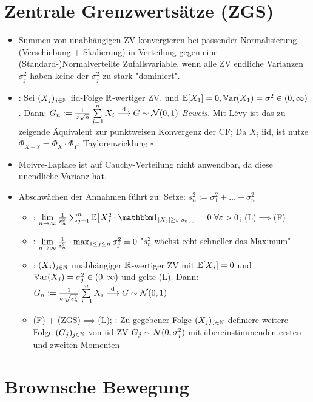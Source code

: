 \documentclass[12pt]{scrartcl}
\begin{document}
	\section{Zentrale Grenzwertsätze (ZGS)}
	
	\begin{itemize}
		\item Summen von unabhängigen ZV konvergieren bei passender Normalisierung (Verschiebung + Skalierung) in Verteilung gegen eine (Standard-)Normalverteilte Zufallsvariable, wenn alle ZV endliche Varianzen $\sigma_j^2$ haben  keine der $\sigma_j^2$ zu stark "dominiert".
		\item {}: Sei $(X_j)_{j\in\mathbb{N}}$ iid-Folge $\mathbb{R}$-wertiger ZV. und $\mathbb{E}[X_1]=0,\mathbb{V}\text{ar}(X_1)=\sigma^2\in(0,\infty)$. Dann: $G_n:=\frac{1}{\sigma\sqrt{n}}\sum\limits_{j=1}^n X_i\overset{\mathrm{d}}{\longrightarrow} G\sim\mathcal{N}(0,1)$
		\textit{Beweis.} Mit Lévy ist das zu zeigende Äquivalent zur punktweisen Konvergenz der CF; Da $X_i$ iid, ist nutze $\Phi_{X+Y}=\Phi_X\cdot\Phi_Y$; Taylorenwicklung $\square$
		\item Moivre-Laplace ist auf Cauchy-Verteilung nicht anwendbar, da diese unendliche Varianz hat.
		\item Abschwächen der Annahmen führt zu:  Setze: $s_n^2:=\sigma_1^2+\ldots+\sigma_n^2$
		\begin{itemize}
			\item {}: $\limn\frac{1}{s_n^2}\sum_{j=1}^n\E\big[X_j^2\cdot\indi_{|X_j|\geq\varepsilon\cdot s_n\rbrace}\big]=0~\forall\varepsilon>0$; (L)$\implies$(F)
			\item {}: $\lim\limits_{n\to\infty}\frac{1}{s_n^2}\cdot\max_{1\leq j\leq n}\sigma_j^2=0$
			"$s_n^2$ wächst echt schneller das Maximum"
			\item {}: $(X_j)_{j\in\mathbb{N}}$ unabhängiger $\mathbb{R}$-wertiger ZV mit $\mathbb{E}[X_j]=0$ und $\mathbb{V}\text{ar}(X_j)=\sigma_j^2\in(0,\infty)$ und gelte (L).
			Dann: $G_n:=\frac{1}{\sigma\sqrt{s_n^2}}\sum\limits_{j=1}^n X_i\overset{\mathrm{d}}{\longrightarrow} G\sim\mathcal{N}(0,1)$
			\item (F) + (ZGS)$\implies$(L); : Zu gegebener Folge $(X_j)_{j\in\mathbb{N}}$ definiere weitere Folge $(G_j)_{j\in\mathbb{N}}$ von iid ZV $G_j\sim\mathcal{N}(0,\sigma_j^2)$ mit übereinstimmenden ersten und zweiten Momenten
		\end{itemize}
	\end{itemize}
	
	\section{Brownsche Bewegung}
	
\end{document}
